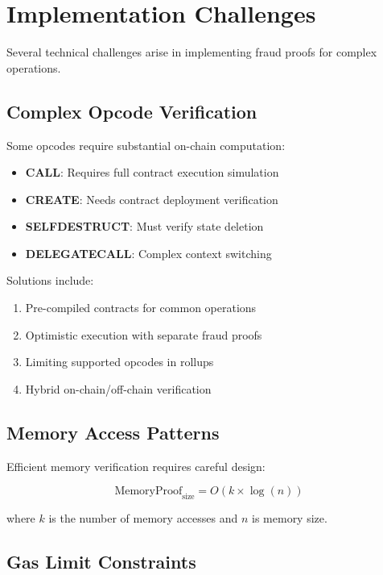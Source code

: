 \section{Implementation Challenges}


Several technical challenges arise in implementing fraud proofs for complex operations.

\subsection{Complex Opcode Verification}

Some opcodes require substantial on-chain computation:

\begin{itemize}
    \item \textbf{CALL}: Requires full contract execution simulation
    \item \textbf{CREATE}: Needs contract deployment verification
    \item \textbf{SELFDESTRUCT}: Must verify state deletion
    \item \textbf{DELEGATECALL}: Complex context switching
\end{itemize}

Solutions include:
\begin{enumerate}
    \item Pre-compiled contracts for common operations
    \item Optimistic execution with separate fraud proofs
    \item Limiting supported opcodes in rollups
    \item Hybrid on-chain/off-chain verification
\end{enumerate}

\subsection{Memory Access Patterns}

Efficient memory verification requires careful design:

\begin{equation}
\text{MemoryProof}_{\text{size}} = O(k \times \log(n))
\end{equation}

where $k$ is the number of memory accesses and $n$ is memory size.

\subsection{Gas Limit Constraints}

